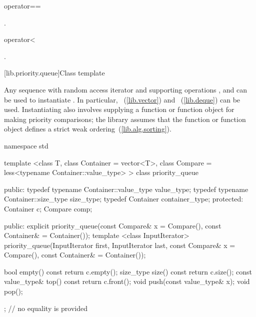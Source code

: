 %
\begin{itemdecl}
operator==
\end{itemdecl}

\begin{itemdescr}
\pnum
\returns
{}.
\end{itemdescr}

%
\begin{itemdecl}
operator<
\end{itemdecl}

\begin{itemdescr}
\pnum
\returns
{}.
\end{itemdescr}

[lib.priority.queue]{Class template }

\pnum
{}%
Any sequence with random access iterator and supporting operations
,
and
can be used to instantiate
.
In particular,
~(\ref{lib.vector})
and
~(\ref{lib.deque})
can be used.
Instantiating
also involves supplying a function or function object for making
priority comparisons; the library assumes that the function or function
object defines a strict weak ordering~(\ref{lib.alg.sorting}).

\begin{codeblock}
namespace std {
  template <class T, class Container = vector<T>,
            class Compare = less<typename Container::value_type> >
  class priority_queue {
  public:
    typedef typename Container::value_type            value_type;
    typedef typename Container::size_type             size_type;
    typedef          Container                        container_type;
  protected:
    Container c;
    Compare comp;

  public:
    explicit priority_queue(const Compare& x = Compare(),
                            const Container& = Container());
    template <class InputIterator>
      priority_queue(InputIterator first, InputIterator last,
                     const Compare& x = Compare(),
                     const Container& = Container());

    bool      empty() const       { return c.empty(); }
    size_type size()  const       { return c.size(); }
    const value_type& top() const { return c.front(); }
    void push(const value_type& x);
    void pop();
  };
                                // no equality is provided
}
\end{codeblock}

